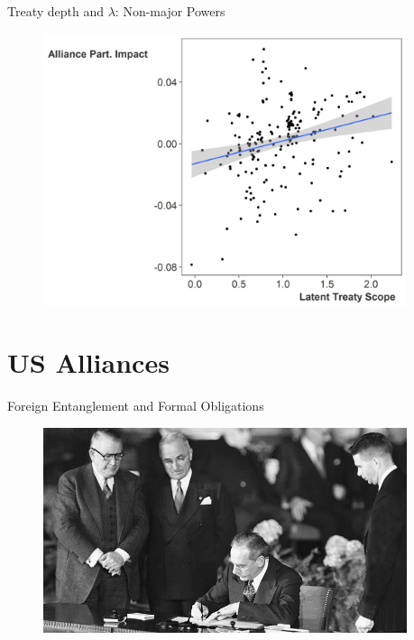 \documentclass[12pt]{beamer}
\begin{document}

\begin{frame}{Treaty depth and $\lambda$: Non-major Powers}

\begin{figure}
	\centering
		\includegraphics[width=0.95\textwidth]{ls-lambda-min.png}
	\label{fig:ls-lambda-min}
\end{figure}


\end{frame}


\section{US Alliances}


\begin{frame}{Foreign Entanglement and Formal Obligations}

\begin{figure}
	\centering
		\includegraphics[width=0.95\textwidth]{acheson-nato-sign.jpg}
	\label{fig:acheson-nato-sign}
\end{figure}


\end{frame}
\end{document}
